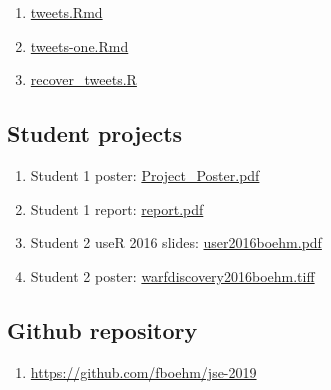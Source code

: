 \documentclass[
]{article}
\providecommand{\tightlist}{%
  \setlength{\itemsep}{0pt}\setlength{\parskip}{0pt}}
\begin{document}
\begin{enumerate}
\def\labelenumi{\arabic{enumi}.}
\tightlist
\item
  \href{https://raw.githubusercontent.com/fboehm/jse-2019/master/Rmd/tweets.Rmd}{tweets.Rmd}
\item
  \href{https://raw.githubusercontent.com/fboehm/jse-2019/master/Rmd/tweets-one.Rmd}{tweets-one.Rmd}
\item
  \href{https://raw.githubusercontent.com/fboehm/jse-2019/master/Rmd/recover_tweets.R}{recover\_tweets.R}
\end{enumerate}

\hypertarget{student-projects}{%
\subsection{Student projects}\label{student-projects}}

\begin{enumerate}
\def\labelenumi{\arabic{enumi}.}
\tightlist
\item
  Student 1 poster: \href{https://github.com/fboehm/jse-2019/blob/master/supplementary/Project_Poster.pdf}{Project\_Poster.pdf}
\item
  Student 1 report: \href{https://github.com/fboehm/jse-2019/blob/master/supplementary/report.pdf}{report.pdf}
\item
  Student 2 useR 2016 slides: \href{https://github.com/fboehm/jse-2019/blob/master/supplementary/user2016boehm.pdf}{user2016boehm.pdf}
\item
  Student 2 poster: \href{https://github.com/fboehm/jse-2019/blob/master/supplementary/warfdiscovery2016boehm.tiff}{warfdiscovery2016boehm.tiff}
\end{enumerate}

\hypertarget{github-repository}{%
\subsection{Github repository}\label{github-repository}}

\begin{enumerate}
\def\labelenumi{\arabic{enumi}.}
\tightlist
\item
  \url{https://github.com/fboehm/jse-2019}
\end{enumerate}
\end{document}
